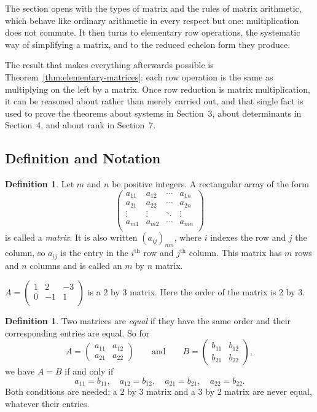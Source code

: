 \documentclass[11pt,a4paper]{article}
\theoremstyle{definition}
\newtheorem{defn}[thm]{Definition}
\begin{document}
The section opens with the types of matrix and the rules of matrix arithmetic,
which behave like ordinary arithmetic in every respect but one: multiplication
does not commute. It then turns to elementary row operations, the systematic
way of simplifying a matrix, and to the reduced echelon form they produce.

The result that makes everything afterwards possible is
Theorem~\ref{thm:elementary-matrices}: each row operation is the same as
multiplying on the left by a matrix. Once row reduction is matrix
multiplication, it can be reasoned about rather than merely carried out, and
that single fact is used to prove the theorems about systems in Section~3,
about determinants in Section~4, and about rank in Section~7.

\subsection{Definition and Notation}
\begin{defn}
Let $m$ and $n$ be positive integers. A rectangular array of the form
$$
\begin{pmatrix}
a_{11}&a_{12}&\cdots&a_{1n}\\
a_{21}&a_{22}&\cdots&a_{2n}\\
\vdots&\vdots&\ddots&\vdots\\
a_{m1}&a_{m2}&\cdots&a_{mn}\\
\end{pmatrix}
$$
is called a \emph{matrix}. It is also written $(a_{ij})_{mn}$, where $i$ indexes
the row and $j$ the column, so $a_{ij}$ is the entry in the $i^{\text{th}}$ row
and $j^{\text{th}}$ column. This matrix has $m$ rows and $n$ columns and is
called an $m$ by $n$ matrix.
\end{defn}

$A=
\begin{pmatrix}
1&2&-3\\0&-1&1\\
\end{pmatrix}
$ is a 2 by 3 matrix. Here the order of the matrix is 2 by 3.


\begin{defn}
Two matrices are \emph{equal} if they have the same order and their
corresponding entries are equal. So for
$$A=\begin{pmatrix}a_{11}&a_{12}\\a_{21}&a_{22}\end{pmatrix}
\qquad\text{and}\qquad
B=\begin{pmatrix}b_{11}&b_{12}\\b_{21}&b_{22}\end{pmatrix},$$
we have $A=B$ if and only if
$$a_{11}=b_{11},\quad a_{12}=b_{12},\quad a_{21}=b_{21},\quad a_{22}=b_{22}.$$
Both conditions are needed: a $2$ by $3$ matrix and a $3$ by $2$ matrix are
never equal, whatever their entries.
\end{defn}
\end{document}
